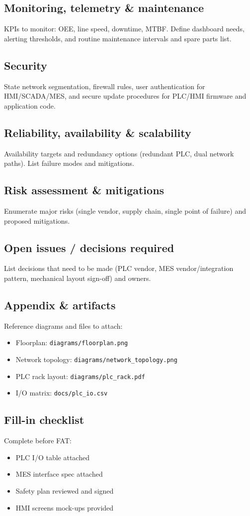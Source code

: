 \documentclass[a4paper,10pt]{article}
\newcommand{\checkbox}{\mbox{\framebox[0.4cm][c]{}}}
\begin{document}
\subsection*{Monitoring, telemetry \& maintenance}
KPIs to monitor: OEE, line speed, downtime, MTBF. Define dashboard needs, alerting thresholds, and routine maintenance intervals and spare parts list.

\subsection*{Security}
State network segmentation, firewall rules, user authentication for HMI/SCADA/MES, and secure update procedures for PLC/HMI firmware and application code.

\subsection*{Reliability, availability \& scalability}
Availability targets and redundancy options (redundant PLC, dual network paths). List failure modes and mitigations.

\subsection*{Risk assessment \& mitigations}
Enumerate major risks (single vendor, supply chain, single point of failure) and proposed mitigations.

\subsection*{Open issues / decisions required}
List decisions that need to be made (PLC vendor, MES vendor/integration pattern, mechanical layout sign-off) and owners.

\subsection*{Appendix \& artifacts}
Reference diagrams and files to attach:
\begin{itemize}
  \item Floorplan: \texttt{diagrams/floorplan.png}
  \item Network topology: \texttt{diagrams/network\_topology.png}
  \item PLC rack layout: \texttt{diagrams/plc\_rack.pdf}
  \item I/O matrix: \texttt{docs/plc\_io.csv}
\end{itemize}

\subsection*{Fill-in checklist}
Complete before FAT:
\begin{itemize}
  \item[\checkbox] PLC I/O table attached
  \item[\checkbox] MES interface spec attached
  \item[\checkbox] Safety plan reviewed and signed
  \item[\checkbox] HMI screens mock-ups provided
\end{itemize}

\end{document}
